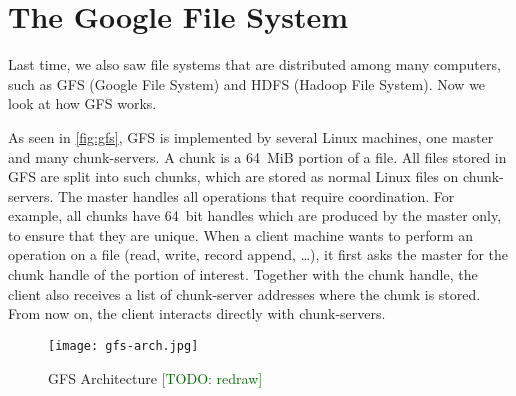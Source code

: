 \section*{The Google File System}

Last time, we also saw file systems that are distributed among many computers,
  such as GFS (Google File System) and HDFS (Hadoop File System).
Now we look at how GFS works.

As seen in \autoref{fig:gfs},
  GFS is implemented by several Linux machines,
  one master and many chunk-servers.
A chunk is a 64~MiB portion of a file.
All files stored in GFS are split into such chunks,
  which are stored as normal Linux files on chunk-servers.
The master handles all operations that require coordination.
For example,
  all chunks have 64~bit handles which are produced by the master only,
  to ensure that they are unique.
When a client machine wants to perform an operation on a file
  (read, write, record append, \dots),
  it first asks the master for the chunk handle of the portion of interest.
Together with the chunk handle,
  the client also receives a list of chunk-server addresses
  where the chunk is stored.
From now on, the client interacts directly with chunk-servers.

\begin{figure} %
\begin{center}
\texttt{[image: gfs-arch.jpg]}
\end{center}
\caption{GFS Architecture
\textcolor{darkgreen}{[TODO: redraw]}
}\label{fig:gfs}
\end{figure}

